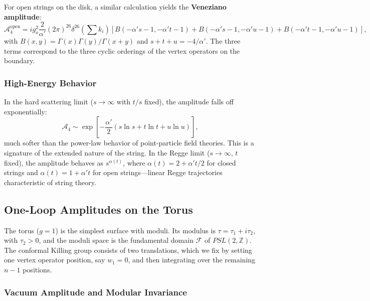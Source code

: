 \documentclass[11pt]{article}
\begin{document}
For open strings on the disk, a similar calculation yields the \textbf{Veneziano amplitude}:
\begin{equation}
\mathcal{A}_4^{\text{open}} = i g_o^2 \frac{2}{\alpha'} (2\pi)^{26} \delta^{26}(\sum k_i) \left[ B(-\alpha' s-1, -\alpha' t-1) + B(-\alpha' s-1, -\alpha' u-1) + B(-\alpha' t-1, -\alpha' u-1) \right],
\end{equation}
with $B(x,y)=\Gamma(x)\Gamma(y)/\Gamma(x+y)$ and $s+t+u = -4/\alpha'$. The three terms correspond to the three cyclic orderings of the vertex operators on the boundary.

\subsubsection{High-Energy Behavior}

In the hard scattering limit ($s \to \infty$ with $t/s$ fixed), the amplitude falls off exponentially:
\begin{equation}
\mathcal{A}_4 \sim \exp\left[ -\frac{\alpha'}{2} \left( s \ln s + t \ln t + u \ln u \right) \right],
\end{equation}
much softer than the power-law behavior of point-particle field theories. This is a signature of the extended nature of the string. In the Regge limit ($s \to \infty$, $t$ fixed), the amplitude behaves as $s^{\alpha(t)}$, where $\alpha(t) = 2 + \alpha' t/2$ for closed strings and $\alpha(t)=1+\alpha' t$ for open strings—linear Regge trajectories characteristic of string theory.

\subsection{One-Loop Amplitudes on the Torus}

The torus ($g=1$) is the simplest surface with moduli. Its modulus is $\tau = \tau_1 + i\tau_2$, with $\tau_2>0$, and the moduli space is the fundamental domain $\mathcal{F}$ of $PSL(2,\mathbb{Z})$. The conformal Killing group consists of two translations, which we fix by setting one vertex operator position, say $w_1=0$, and then integrating over the remaining $n-1$ positions.

\subsubsection{Vacuum Amplitude and Modular Invariance}
\end{document}
